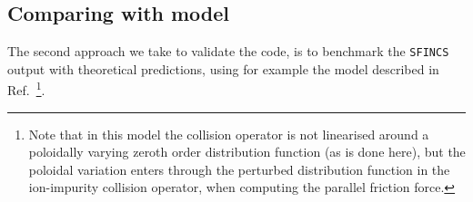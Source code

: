 \documentclass[12pt]{article}
\begin{document}






\subsection*{Comparing with model}
The second approach we take to validate the code, is to benchmark the \texttt{SFINCS} output with theoretical predictions, using for example the model described in Ref.~\cite{ref:Fulop}\footnote{Note that in this model the collision operator is not linearised around a poloidally varying zeroth order distribution function (as is done here), but the poloidal variation enters through the perturbed distribution function in the ion-impurity collision operator, when computing the parallel friction force.}. 
\end{document}
